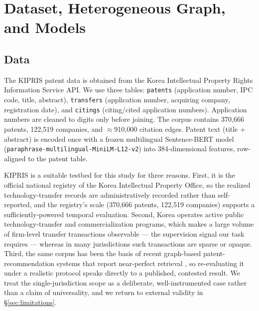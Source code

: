 \documentclass[preprint,12pt]{elsarticle}
\begin{document}
\section{Dataset, Heterogeneous Graph, and Models}
\label{sec:data}

\subsection{Data}
The KIPRIS patent data is obtained from the Korea Intellectual Property Rights
Information Service API. We use three tables: \texttt{patents} (application number,
IPC code, title, abstract), \texttt{transfers} (application number, acquiring
company, registration date), and \texttt{citings} (citing/cited application numbers).
Application numbers are cleaned to digits only before joining. The corpus contains
370,666 patents, 122,519 companies, and $\approx$910,000 citation edges. Patent text
(title + abstract) is encoded once with a frozen multilingual Sentence-BERT model
(\texttt{paraphrase-multilingual-MiniLM-L12-v2}) \cite{reimers2019,reimers2020} into
384-dimensional features, row-aligned to the patent table.

KIPRIS is a suitable testbed for this study for three reasons. First, it is the
official national registry of the Korea Intellectual Property Office, so the realized
technology-transfer records are administratively recorded rather than self-reported,
and the registry's scale (370,666 patents, 122,519 companies) supports a
sufficiently-powered temporal evaluation. Second, Korea operates active public
technology-transfer and commercialization programs, which makes a large volume of
firm-level transfer transactions observable --- the supervision signal our task
requires --- whereas in many jurisdictions such transactions are sparse or opaque.
Third, the same corpus has been the basis of recent graph-based patent-recommendation
systems that report near-perfect retrieval \cite{kim2025}, so re-evaluating it under a
realistic protocol speaks directly to a published, contested result. We treat the
single-jurisdiction scope as a deliberate, well-instrumented case rather than a claim
of universality, and we return to external validity in \S\ref{sec:limitations}.
\end{document}
